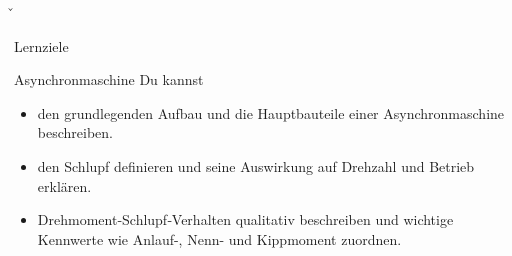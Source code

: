 \v{
	\begin{frame}{Lernziele}
		\begin{Lernziele}{Asynchronmaschine}
			Du kannst
			\begin{itemize}
				\item den grundlegenden Aufbau und die Hauptbauteile einer Asynchronmaschine beschreiben.
				\item den Schlupf definieren und seine Auswirkung auf Drehzahl und Betrieb erklären.
				\item Drehmoment‑Schlupf‑Verhalten qualitativ beschreiben und wichtige Kennwerte wie Anlauf-, Nenn- und Kippmoment zuordnen.
			\end{itemize}
		\end{Lernziele}
	\end{frame}
}
